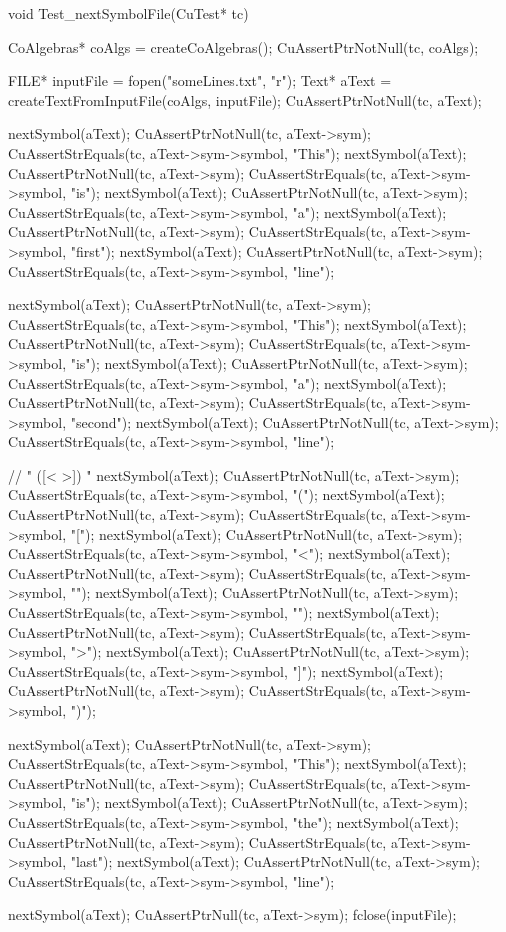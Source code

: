 void Test_nextSymbolFile(CuTest* tc) {
  CoAlgebras* coAlgs = createCoAlgebras();
  CuAssertPtrNotNull(tc, coAlgs);

  FILE* inputFile = fopen("someLines.txt", "r");
  Text* aText = createTextFromInputFile(coAlgs, inputFile);
  CuAssertPtrNotNull(tc, aText);

  nextSymbol(aText);
  CuAssertPtrNotNull(tc, aText->sym);
  CuAssertStrEquals(tc, aText->sym->symbol, "This");
  nextSymbol(aText);
  CuAssertPtrNotNull(tc, aText->sym);
  CuAssertStrEquals(tc, aText->sym->symbol, "is");
  nextSymbol(aText);
  CuAssertPtrNotNull(tc, aText->sym);
  CuAssertStrEquals(tc, aText->sym->symbol, "a");
  nextSymbol(aText);
  CuAssertPtrNotNull(tc, aText->sym);
  CuAssertStrEquals(tc, aText->sym->symbol, "first");
  nextSymbol(aText);
  CuAssertPtrNotNull(tc, aText->sym);
  CuAssertStrEquals(tc, aText->sym->symbol, "line");

  nextSymbol(aText);
  CuAssertPtrNotNull(tc, aText->sym);
  CuAssertStrEquals(tc, aText->sym->symbol, "This");
  nextSymbol(aText);
  CuAssertPtrNotNull(tc, aText->sym);
  CuAssertStrEquals(tc, aText->sym->symbol, "is");
  nextSymbol(aText);
  CuAssertPtrNotNull(tc, aText->sym);
  CuAssertStrEquals(tc, aText->sym->symbol, "a");
  nextSymbol(aText);
  CuAssertPtrNotNull(tc, aText->sym);
  CuAssertStrEquals(tc, aText->sym->symbol, "second");
  nextSymbol(aText);
  CuAssertPtrNotNull(tc, aText->sym);
  CuAssertStrEquals(tc, aText->sym->symbol, "line");

  // " ([<{ }>]) "
  nextSymbol(aText);
  CuAssertPtrNotNull(tc, aText->sym);
  CuAssertStrEquals(tc, aText->sym->symbol, "(");
  nextSymbol(aText);
  CuAssertPtrNotNull(tc, aText->sym);
  CuAssertStrEquals(tc, aText->sym->symbol, "[");
  nextSymbol(aText);
  CuAssertPtrNotNull(tc, aText->sym);
  CuAssertStrEquals(tc, aText->sym->symbol, "<");
  nextSymbol(aText);
  CuAssertPtrNotNull(tc, aText->sym);
  CuAssertStrEquals(tc, aText->sym->symbol, "{");
  nextSymbol(aText);
  CuAssertPtrNotNull(tc, aText->sym);
  CuAssertStrEquals(tc, aText->sym->symbol, "}");
  nextSymbol(aText);
  CuAssertPtrNotNull(tc, aText->sym);
  CuAssertStrEquals(tc, aText->sym->symbol, ">");
  nextSymbol(aText);
  CuAssertPtrNotNull(tc, aText->sym);
  CuAssertStrEquals(tc, aText->sym->symbol, "]");
  nextSymbol(aText);
  CuAssertPtrNotNull(tc, aText->sym);
  CuAssertStrEquals(tc, aText->sym->symbol, ")");

  nextSymbol(aText);
  CuAssertPtrNotNull(tc, aText->sym);
  CuAssertStrEquals(tc, aText->sym->symbol, "This");
  nextSymbol(aText);
  CuAssertPtrNotNull(tc, aText->sym);
  CuAssertStrEquals(tc, aText->sym->symbol, "is");
  nextSymbol(aText);
  CuAssertPtrNotNull(tc, aText->sym);
  CuAssertStrEquals(tc, aText->sym->symbol, "the");
  nextSymbol(aText);
  CuAssertPtrNotNull(tc, aText->sym);
  CuAssertStrEquals(tc, aText->sym->symbol, "last");
  nextSymbol(aText);
  CuAssertPtrNotNull(tc, aText->sym);
  CuAssertStrEquals(tc, aText->sym->symbol, "line");

  nextSymbol(aText);
  CuAssertPtrNull(tc, aText->sym);
  fclose(inputFile);
}
\stoptyping